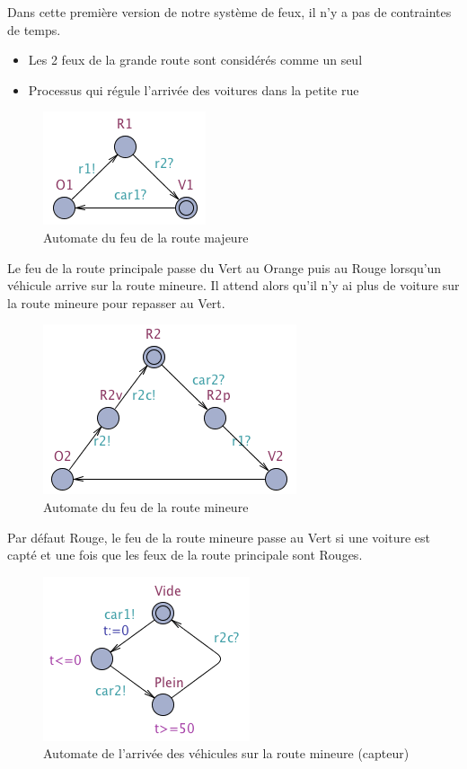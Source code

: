 \documentclass[11pt]{article}
\begin{document}
Dans cette première version de notre système de feux, il n'y a pas de contraintes de temps.


\begin{itemize}
	\item Les 2 feux de la grande route sont considérés comme un seul
	\item Processus qui régule l'arrivée des voitures dans la petite rue
\end{itemize}

\begin{figure}[H]
	\centering
	\includegraphics{ressources/part3/Q9-1.png}
	\caption{Automate du feu de la route majeure}
\end{figure}

Le feu de la route principale passe du Vert au Orange puis au Rouge lorsqu'un véhicule arrive sur la route mineure. Il attend alors qu'il n'y ai plus de voiture sur la route mineure pour repasser au Vert.

\begin{figure}[H]
	\centering
	\includegraphics{ressources/part3/Q9-2.png}
	\caption{Automate du feu de la route mineure}
\end{figure}

Par défaut Rouge, le feu de la route mineure passe au Vert si une voiture est capté et une fois que les feux de la route principale sont Rouges.

\begin{figure}[H]
	\centering
	\includegraphics{ressources/part3/Q9-3.png}
	\caption{Automate de l'arrivée des véhicules sur la route mineure (capteur)}
\end{figure}
\end{document}
